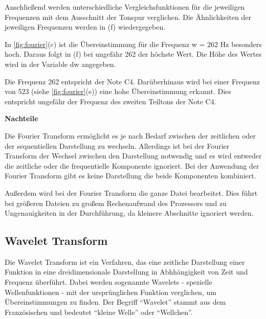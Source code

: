Anschließend werden unterschiedliche Vergleichsfunktionen für die jeweiligen Frequenzen mit dem Ausschnitt der Tonspur verglichen. Die Ähnlichkeiten der jeweiligen Frequenzen werden in (f) wiedergegeben.

\par

In \cref{fig:fourier}(c) ist die Übereinstimmung für die Frequenz w = 262 Hz besonders hoch. Daraus folgt in (f) bei ungefähr 262 der höchste Wert. Die Höhe des Wertes wird in der Variable dw angegeben.


\par

Die Frequenz 262 entspricht der Note C4. Darüberhinaus wird bei einer Frequenz von 523 (siehe \cref{fig:fourier}(e)) eine hohe Übereinstimmung erkannt. Dies entspricht ungefähr der Frequenz des zweiten Teiltons der Note C4.

%
\textbf{Nachteile}
\label{disadvantages_fourier}
%
    
Die Fourier Transform ermöglicht es je nach Bedarf zwischen der zeitlichen oder der sequentiellen Darstellung zu wechseln. Allerdings ist bei der Fourier Transform der Wechsel zwischen den Darstellung notwendig und es wird entweder die zeitliche oder die frequentielle Komponente ignoriert. Bei der Anwendung der Fourier Transform gibt es keine Darstellung die beide Komponenten kombiniert.

\par

Außerdem wird bei der Fourier Transform die ganze Datei bearbeitet. Dies führt bei größeren Dateien zu großem Rechenaufwand des Prozessors und zu Ungenauigkeiten in der Durchführung, da kleinere Abschnitte ignoriert werden.

%
\subsection{Wavelet Transform}
\label{wavelet-transformation}
%

Die Wavelet Transform ist ein Verfahren, das eine zeitliche Darstellung einer Funktion in eine dreidimensionale Darstellung in Abhhängigkeit von Zeit und Frequenz überführt. Dabei werden sogenannte Wavelets - spezielle Wellenfunktionen - mit der ursprünglichen Funktion verglichen, um Übereinstimmungen zu finden. Der Begriff \enquote{Wavelet} stammt aus dem Französischen und bedeutet \enquote{kleine Welle} oder \enquote{Wellchen}.

\par

